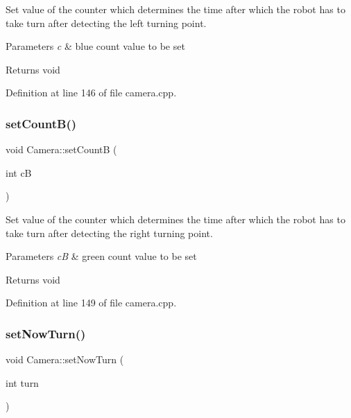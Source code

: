 Set value of the counter which determines the time after which the robot has to take turn after detecting the left turning point. 


\begin{DoxyParams}{Parameters}
{\em c} & blue count value to be set \\
\hline
\end{DoxyParams}
\begin{DoxyReturn}{Returns}
void 
\end{DoxyReturn}


Definition at line 146 of file camera.\+cpp.

\mbox{\label{class_camera_a66d6f05a42feb58468bc4039b07b1b23}} 
\subsubsection{\texorpdfstring{set\+Count\+B()}{setCountB()}}
{\footnotesize\ttfamily void Camera\+::set\+CountB (\begin{DoxyParamCaption}\item[{int}]{cB }\end{DoxyParamCaption})}



Set value of the counter which determines the time after which the robot has to take turn after detecting the right turning point. 


\begin{DoxyParams}{Parameters}
{\em cB} & green count value to be set \\
\hline
\end{DoxyParams}
\begin{DoxyReturn}{Returns}
void 
\end{DoxyReturn}


Definition at line 149 of file camera.\+cpp.

\mbox{\label{class_camera_a77cd72118fd9d03e04beaf60f7345138}} 
\subsubsection{\texorpdfstring{set\+Now\+Turn()}{setNowTurn()}}
{\footnotesize\ttfamily void Camera\+::set\+Now\+Turn (\begin{DoxyParamCaption}\item[{int}]{turn }\end{DoxyParamCaption})}



